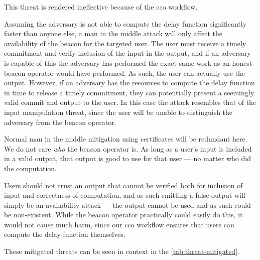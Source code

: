 This threat is rendered ineffective because of the \gls{cco} workflow.

Assuming the adversary is not able to compute the delay function significantly faster than anyone else, a man in the middle attack will only affect the availability of the beacon for the targeted user.
The user must receive a timely commitment and verify inclusion of the input in the output, and if an adversary is capable of this the adversary has performed the exact same work as an honest beacon operator would have performed.
As such, the user can actually use the output.
However, if an adversary has the resources to compute the delay function in time to release a timely commitment, they can potentially present a seemingly valid commit and output to the user.
In this case the attack resembles that of the input manipulation threat, since the user will be unable to distinguish the adversary from the beacon operator.

Normal man in the middle mitigation using certificates will be redundant here.
We do not care \emph{who} the beacon operator is.
As long as a user's input is included in a valid output, that output is good to use for that user --- no matter who did the computation.

Users should not trust an output that cannot be verified both for inclusion of input and correctness of computation, and as such emitting a false output will simply be an availability attack --- the output cannot be used and as such could be non-existent.
While the beacon operator practically could easily do this, it would not cause much harm, since our \gls{cco} workflow ensures that users can compute the delay function themselves.


\bigskip
These mitigated threats can be seen in context in the \cref{tab:threat-mitigated}.


